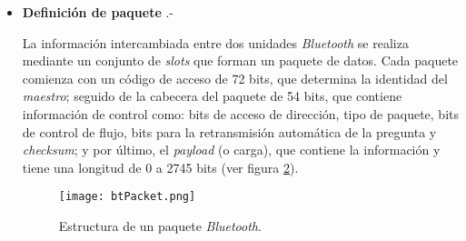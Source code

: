\begin{itemize}
Dos o más unidades \emph{Bluetooth} pueden compartir el mismo canal dentro
de una \emph{piconet}\footnote{Red formada por dos o más unidades
\emph{Bluetooth} que comparten un mismo canal.}, donde una actúa como
\emph{maestra}, controlando el tráfico que se genera entre las demás unidades,
que actúan como \emph{esclavas}, enviando y recibiendo señales hacia la
unidad \emph{maestra}. El salto de frecuencia del canal está determinado por
la secuencia de la señal, es decir, por el orden en que llegan los saltos y
por la fase de esta secuencia. En \emph{Bluetooth}, la secuencia queda fijada
por la identidad de la unidad maestra de la \emph{piconet} (un código único
para cada equipo) y por su frecuencia de reloj. Por lo que, para que una unidad
\emph{esclava} pueda sincronizarse con una unidad \emph{maestra}, debe añadir
un ajuste a su propio reloj y así poder compartir la misma portadora de salto.

  \begin{figure}[H]
    \begin{center}
      \texttt{[image: btExample.png]}
      \caption{Red \emph{Bluetooth} formada por varios dispositivos. El
      portátil ejerce de \emph{maestro}.}
      \label{fig:btExample}
    \end{center}
  \end{figure}

\item \textbf{Definición de paquete} .-

La información intercambiada entre dos unidades \emph{Bluetooth} se realiza
mediante un conjunto de \emph{slots} que forman un paquete de datos.
Cada paquete comienza con un código de acceso de 72 bits, que
determina la identidad del \emph{maestro}; seguido de la cabecera del
paquete de 54 bits, que contiene información de control como: bits de
acceso de dirección, tipo de paquete, bits de control de flujo, bits para la 
retransmisión automática de la pregunta y \emph{checksum}; y por último, el
\emph{payload} (o carga), que contiene la información y tiene una longitud de
0 a 2745 bits (ver figura \ref{fig:btPacket}).

  \begin{figure}[H]
    \begin{center}
      \texttt{[image: btPacket.png]}
      \caption{Estructura de un paquete \emph{Bluetooth}.}
      \label{fig:btPacket}
    \end{center}
  \end{figure}


\end{itemize}
